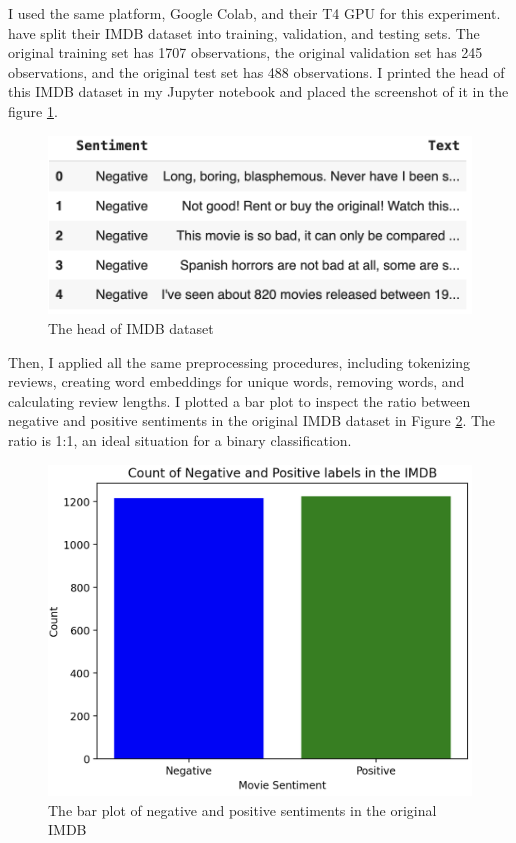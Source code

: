 \documentclass[aoas]{imsart}
\numberwithin{equation}{section}
\theoremstyle{plain}
\theoremstyle{remark}
\begin{document}
I used the same platform, Google Colab, and their T4 GPU for this experiment. \cite{DBLP:journals/corr/abs-1909-12434} have split their IMDB dataset into training, validation, and testing sets. The original training set has 1707 observations, the original validation set has 245 observations, and the original test set has 488 observations. I printed the head of this IMDB dataset in my Jupyter notebook and placed the screenshot of it in the figure \ref{Fig17: imdb}.
\begin{figure}[ht]
\includegraphics[scale=0.7]{img/imdb.png}
\caption{The head of IMDB dataset}
\label{Fig17: imdb}
\end{figure}
Then, I applied all the same preprocessing procedures, including tokenizing reviews, creating word embeddings for unique words, removing words, and calculating review lengths. I plotted a bar plot to inspect the ratio between negative and positive sentiments in the original IMDB dataset in Figure \ref{Fig18: imdbsent}. The ratio is 1:1, an ideal situation for a binary classification. 
\begin{figure}[ht]
\includegraphics[scale=0.3]{img/imdbsent.png}
\caption{The bar plot of negative and positive sentiments in the original IMDB}
\label{Fig18: imdbsent}
\end{figure}
\end{document}
